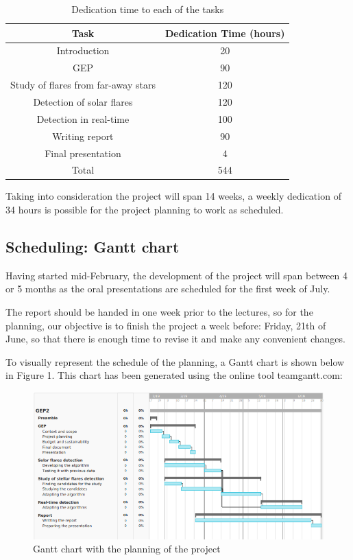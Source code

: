 \begin{table}[h!]
	\centering
	\begin{tabular}{||c c||} 
		\hline
		Task & Dedication Time (hours) \\ [0.5ex] 
		\hline\hline
		Introduction & 20  \\ 
		\hline
		GEP & 90  \\
		\hline
		Study of flares from far-away stars & 120 \\
		\hline
		Detection of solar flares & 120  \\
		\hline
		Detection in real-time & 100  \\ 
		\hline
		Writing report & 90  \\ 
		\hline
		Final presentation & 4 \\
		\hline\hline
		Total & 544  \\
		\hline
	\end{tabular}
	\caption{Dedication time to each of the tasks}
	\label{table:1}
\end{table}

Taking into consideration the project will span 14 weeks, a weekly dedication of 34 hours is possible for the project planning to work as scheduled.

\subsection{Scheduling: Gantt chart}

Having started mid-February, the development of the project will span between 4 or 5 months as the oral presentations are scheduled for the first week of July. 

The report should be handed in one week prior to the lectures, so for the planning, our objective is to finish the project a week before: Friday, 21th of June, so that there is enough time to revise it and make any convenient changes.

To visually represent the schedule of the planning, a Gantt chart is shown below in Figure 1. This chart has been generated using the online tool teamgantt.com: 

\vspace{0.25cm}

\begin{figure}[ht]
	\centering	
	\includegraphics[width=0.9\linewidth]{images/chGEP/GanttChart.png}
	\caption{Gantt chart with the planning of the project }
\end{figure}
	

